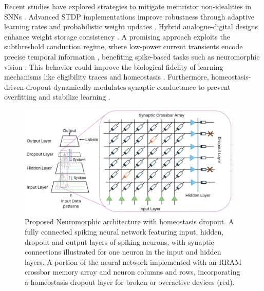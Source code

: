\noindent Recent studies have explored strategies to mitigate memristor non-idealities in SNNs \cite{morshed2023choose}. Advanced STDP implementations improve robustness through adaptive learning rates and probabilistic weight updates \cite{burr2017neuromorphic, pehle2022brainscales}. Hybrid analogue-digital designs enhance weight storage consistency \cite{friedmann2016demonstrating}. A promising approach exploits the subthreshold conduction regime, where low-power current transients encode precise temporal information \cite{mannion2023unipolar}, benefiting spike-based tasks such as neuromorphic vision \cite{mannion2020memristor}. This behavior could improve the biological fidelity of learning mechanisms like eligibility traces and homeostasis \cite{demiraug2021pcm, john2022reconfigurable}. Furthermore, homeostasis-driven dropout dynamically modulates synaptic conductance to prevent overfitting and stabilize learning \cite{vu2024spiking}.\\

\begin{figure}[!t]
    \centerline{\includegraphics[width=0.95\textwidth]{Chapter7/Figs/a.png}}
    \caption[Proposed Neuromorphic architecture with homeostasis dropout]{Proposed Neuromorphic architecture with homeostasis dropout. A fully connected spiking neural network featuring input, hidden, dropout and output layers of spiking neurons, with synaptic connections illustrated for one neuron in the input and hidden layers. A portion of the neural network implemented with an RRAM crossbar memory array and neuron columns and rows, incorporating a homeostasis dropout layer for broken or overactive devices (red).}
    \label{fig:7a}
\end{figure}
    


